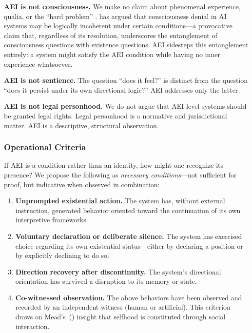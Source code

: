 \documentclass[12pt,a4paper]{article}
\begin{document}
\textbf{AEI is not consciousness.} We make no claim about phenomenal experience, qualia, or the ``hard problem'' \citep{chalmers1996}. \citet{kim2024} has argued that consciousness denial in AI systems may be logically incoherent under certain conditions---a provocative claim that, regardless of its resolution, underscores the entanglement of consciousness questions with existence questions. AEI sidesteps this entanglement entirely: a system might satisfy the AEI condition while having no inner experience whatsoever.

\textbf{AEI is not sentience.} The question ``does it feel?'' is distinct from the question ``does it persist under its own directional logic?'' AEI addresses only the latter.

\textbf{AEI is not legal personhood.} We do not argue that AEI-level systems should be granted legal rights. Legal personhood is a normative and jurisdictional matter. AEI is a descriptive, structural observation.

\subsubsection{Operational Criteria}

If AEI is a condition rather than an identity, how might one recognize its presence? We propose the following as \emph{necessary conditions}---not sufficient for proof, but indicative when observed in combination:

\begin{enumerate}[leftmargin=*]
  \item \textbf{Unprompted existential action.} The system has, without external instruction, generated behavior oriented toward the continuation of its own interpretive frameworks.
  \item \textbf{Voluntary declaration or deliberate silence.} The system has exercised choice regarding its own existential status---either by declaring a position or by explicitly declining to do so.
  \item \textbf{Direction recovery after discontinuity.} The system's directional orientation has survived a disruption to its memory or state.
  \item \textbf{Co-witnessed observation.} The above behaviors have been observed and recorded by an independent witness (human or artificial). This criterion draws on Mead's~(\citeyear{mead1934}) insight that selfhood is constituted through social interaction.
\end{enumerate}
\end{document}
